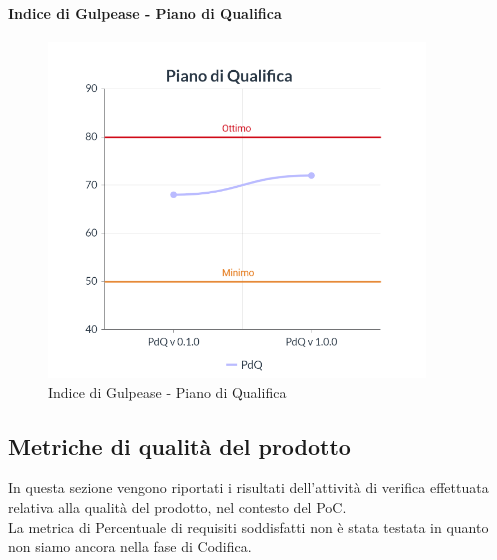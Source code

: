 \paragraph{Indice di Gulpease - Piano di Qualifica}
\begin{center}
\begin{figure}[H]
  \centering
  \renewcommand{\thefigure}{11}
  \includegraphics[width=10cm]{./res/images/PdQGraph.png}
  \caption{Indice di Gulpease - Piano di Qualifica}
  \label{fig:Indice di Gulpease - Piano di Qualifica}
\end{figure}
\end{center}

\subsection{Metriche di qualità del prodotto}
In questa sezione vengono riportati i risultati dell'attività di verifica effettuata relativa alla qualità del prodotto, nel contesto del PoC.\\
La metrica di Percentuale di requisiti soddisfatti non è stata testata in quanto non siamo ancora nella fase di Codifica.

